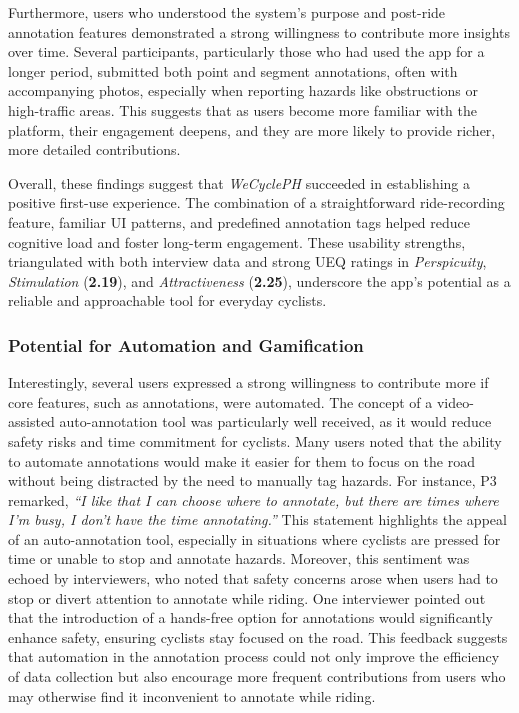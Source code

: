 Furthermore, users who understood the system's purpose and post-ride annotation features demonstrated a strong willingness to contribute more insights over time. Several participants, particularly those who had used the app for a longer period, submitted both point and segment annotations, often with accompanying photos, especially when reporting hazards like obstructions or high-traffic areas. This suggests that as users become more familiar with the platform, their engagement deepens, and they are more likely to provide richer, more detailed contributions.

Overall, these findings suggest that \textit{WeCyclePH} succeeded in establishing a positive first-use experience. The combination of a straightforward ride-recording feature, familiar UI patterns, and predefined annotation tags helped reduce cognitive load and foster long-term engagement. These usability strengths, triangulated with both interview data and strong UEQ ratings in \textit{Perspicuity}, \textit{Stimulation} (\textbf{2.19}), and \textit{Attractiveness} (\textbf{2.25}), underscore the app's potential as a reliable and approachable tool for everyday cyclists.

\subsubsection{Potential for Automation and Gamification}

Interestingly, several users expressed a strong willingness to contribute more if core features, such as annotations, were automated. The concept of a video-assisted auto-annotation tool was particularly well received, as it would reduce safety risks and time commitment for cyclists. Many users noted that the ability to automate annotations would make it easier for them to focus on the road without being distracted by the need to manually tag hazards. For instance, P3 remarked, \textit{``I like that I can choose where to annotate, but there are times where I'm busy, I don't have the time annotating.''} This statement highlights the appeal of an auto-annotation tool, especially in situations where cyclists are pressed for time or unable to stop and annotate hazards. Moreover, this sentiment was echoed by interviewers, who noted that safety concerns arose when users had to stop or divert attention to annotate while riding. One interviewer pointed out that the introduction of a hands-free option for annotations would significantly enhance safety, ensuring cyclists stay focused on the road. This feedback suggests that automation in the annotation process could not only improve the efficiency of data collection but also encourage more frequent contributions from users who may otherwise find it inconvenient to annotate while riding.

